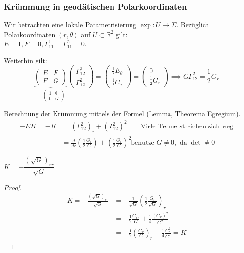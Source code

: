 \documentclass[../main.tex]{subfiles}
\begin{document}
\subsubsection*{Krümmung in geodätischen Polarkoordinaten}
Wir betrachten eine lokale Parametrisierung $\exp : U \to \Sigma$. Bezüglich Polarkoordinaten $(r, \theta)$ auf $U \subset \mathbb{R}^2$ gilt: \\
$E=1, F=0, \Gamma^1_{11}=\Gamma^2_{11}=0$.

Weiterhin gilt:
$$
\underbrace{\begin{pmatrix}
    E & F \\ F & G
\end{pmatrix}}_{= \begin{pmatrix}
    1 & 0 \\ 0 & G
\end{pmatrix}}
\begin{pmatrix}
    \Gamma^1_{12} \\ \Gamma^2_{12}
\end{pmatrix} = 
\begin{pmatrix}
    \frac{1}{2}E_{\theta} \\ \frac{1}{2}G_r
\end{pmatrix} =
\begin{pmatrix}
    0 \\ \frac{1}{2}G_r
\end{pmatrix} \implies G\Gamma^2_{12} = \frac{1}{2}G_r
$$

Berechnung der Krümmung mittels der Formel (Lemma, Theorema Egregium).
\begin{align*}
    -EK = -K & = (\Gamma^2_{12})_r + (\Gamma^2_{12})^2 \qquad \text{Viele Terme streichen sich weg}\\
    & = \frac{d}{dr}\left(\frac{1}{2}\frac{G_r}{G}\right) + \left(\frac{1}{2}\frac{G_r}{G}\right)^2 \text{benutze $G\not =0,$ da $\det \not = 0$}
\end{align*}

\begin{proposition}
    $K = -\dfrac{(\sqrt{G})_{rr}}{\sqrt{G}}$
\end{proposition}
\begin{proof}
    \begin{align*}
        K = -\frac{(\sqrt{G})_{rr}}{\sqrt{G}} & = - \frac{1}{\sqrt{G}}\left(\frac{1}{2}\frac{G_r}{\sqrt{G}}\right)_r \\
        & = -\frac{1}{2}\frac{G_{rr}}{G} + \frac{1}{4}\frac{(G_r)^2}{G^2} \\
        & = -\frac{1}{2}\left(\frac{G_r}{G}\right)_r - \frac{1}{4}\frac{G_r^2}{G^2} = K
    \end{align*}
\end{proof}
\end{document}
